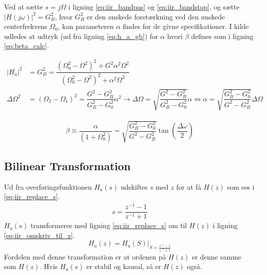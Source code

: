     Ved at sætte $s = j \Omega$ i ligning \ref{eq:iir_bandpas} og \ref{eq:iir_bandstop}, og sætte $\big| H(j\omega)\big|^2 = G_B^2$, hvor $G_B^2$ er den ønskede forstærkning ved den ønskede centerfrekvens $\Omega_0$, kan parameteren $\alpha$ findes for de givne specifikationer.
   I kilde \cite{Orfanidis1996} udledes at udtryk (ud fra ligning \ref{eq:h_a_gb}) for $\alpha$ hvori $\beta$ defines som i ligning \ref{eq:beta_calc}. 

    \begin{align}
        |H_{a}|^2 &= G_B^2 =  \dfrac{(\Omega_0^2- \Omega^2)^2 + G^2 \alpha^2 \Omega^2}{(\Omega_0^2-\Omega^2)^2 +\alpha^2 \Omega^2}  %
        \label{eq:h_a_gb}\\
       \Delta \Omega^2 &= (\Omega_2 - \Omega_1 )^2 = \dfrac{G^2 - G_B^2}{G_B^2 - G_0^2}  \alpha^2 \rightarrow \Delta \Omega = \sqrt{\dfrac{G^2 - G_B^2}{G_B^2 - G_0^2}} \alpha \iff \alpha = \sqrt{\dfrac{G_B^2-G_0^2}{G^2 - G_B^2 }} \Delta \Omega
       \label{eq:beta_calc}
    \end{align}


    \begin{align}
    \beta \equiv \dfrac{\alpha}{(1 + \Omega_0^2)}    = \sqrt{\dfrac{G_B^2-G_0^2}{G^2 - G_B^2 }} \tan \left( \dfrac{\Delta \omega}{2} \right) \label{eq:beta}
    \end{align}


    \subsection{Bilinear Transformation}
    Ud fra overføringsfunktionen $H_a(s)$ udskiftes $s$ med $z$ for at få $H(z)$ som ses i \ref{eq:iir_replace_s}.
    \begin{align}
    s =   \dfrac{z^{-1} - 1}{z^{-1} + 1} \label{eq:iir_replace_s}
    \end{align}
	$H_a(s)$ transformeres med ligning \ref{eq:iir_replace_s} om til $H(z)$ i ligning \ref{eq:iir_omskriv_til_z}.
    \begin{equation}
    H_a(z) = H_a(S)\bigg|_{S = \frac{z^{-1} -1 }{z^{-1} + 1}} \label{eq:iir_omskriv_til_z}
    \end{equation}
    Fordelen med denne transformation er at ordenen på $H(z)$ er denne samme som $H(z)$. Hvis $H_a(s)$ er stabil og kausal, så er $H(z)$ også.
    
